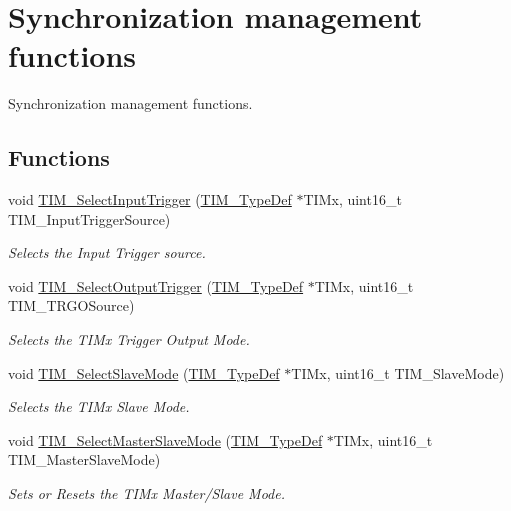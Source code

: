\hypertarget{group___t_i_m___group7}{}\section{Synchronization management functions}
\label{group___t_i_m___group7}


Synchronization management functions.  


\subsection*{Functions}
\begin{DoxyCompactItemize}
\item 
void \hyperlink{group___t_i_m___group7_ga4252583c6ae8a73d6fc66f7e951dbc35}{T\+I\+M\+\_\+\+Select\+Input\+Trigger} (\hyperlink{struct_t_i_m___type_def}{T\+I\+M\+\_\+\+Type\+Def} $\ast$T\+I\+Mx, uint16\+\_\+t T\+I\+M\+\_\+\+Input\+Trigger\+Source)
\begin{DoxyCompactList}\small\item\em Selects the Input Trigger source. \end{DoxyCompactList}\item 
void \hyperlink{group___t_i_m___group7_ga28745aaa549e2067e42c19569209e6c6}{T\+I\+M\+\_\+\+Select\+Output\+Trigger} (\hyperlink{struct_t_i_m___type_def}{T\+I\+M\+\_\+\+Type\+Def} $\ast$T\+I\+Mx, uint16\+\_\+t T\+I\+M\+\_\+\+T\+R\+G\+O\+Source)
\begin{DoxyCompactList}\small\item\em Selects the T\+I\+Mx Trigger Output Mode. \end{DoxyCompactList}\item 
void \hyperlink{group___t_i_m___group7_ga2f19ce1d90990691cf037e419ba08003}{T\+I\+M\+\_\+\+Select\+Slave\+Mode} (\hyperlink{struct_t_i_m___type_def}{T\+I\+M\+\_\+\+Type\+Def} $\ast$T\+I\+Mx, uint16\+\_\+t T\+I\+M\+\_\+\+Slave\+Mode)
\begin{DoxyCompactList}\small\item\em Selects the T\+I\+Mx Slave Mode. \end{DoxyCompactList}\item 
void \hyperlink{group___t_i_m___group7_ga4dcc3d11b670c381d0ff9cb7e9fd01e2}{T\+I\+M\+\_\+\+Select\+Master\+Slave\+Mode} (\hyperlink{struct_t_i_m___type_def}{T\+I\+M\+\_\+\+Type\+Def} $\ast$T\+I\+Mx, uint16\+\_\+t T\+I\+M\+\_\+\+Master\+Slave\+Mode)
\begin{DoxyCompactList}\small\item\em Sets or Resets the T\+I\+Mx Master/\+Slave Mode. \end{DoxyCompactList}\item 

\end{DoxyCompactItemize}
